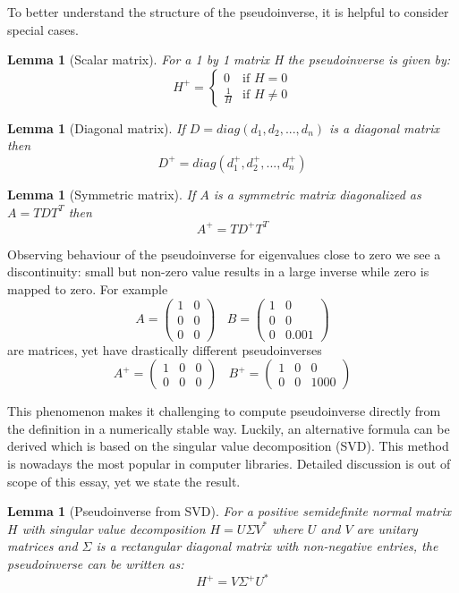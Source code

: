 \documentclass[a4paper,11pt]{article}
\theoremstyle{break}
\newtheorem{lemma}[theorem]{Lemma}
\begin{document}
To better understand the structure of the pseudoinverse, it is helpful to consider special cases.
\begin{lemma}[Scalar matrix]
    For a 1 by 1 matrix H the pseudoinverse is given by:
    $$ H^+ = \begin{cases}
        0~~~           \text{ if } H = 0\\
        \frac{1}{H}~~ \text{ if } H \neq 0
    \end{cases}$$
\end{lemma}
\begin{lemma}[Diagonal matrix]
    If $D = diag(d_1, d_2, ..., d_n)$ is a diagonal matrix then
    $$ D^+ = diag(d_1^+, d_2^+, ..., d_n^+) $$
\end{lemma}
\begin{lemma}[Symmetric matrix]
    If $A$ is a symmetric matrix diagonalized as $A = T D T^T $ then
    $$ A^+ = T D^+ T^T$$
\end{lemma}

Observing behaviour of the pseudoinverse for eigenvalues close to zero we see a discontinuity: small but non-zero value results in a large inverse while zero is mapped to zero. For example
$$ A = \left( \begin{matrix}
1 & 0 \\
0 & 0 \\
0 & 0
\end{matrix} \right) ~~~~
B = \left( \begin{matrix}
1 & 0 \\
0 & 0 \\
0 & 0.001
\end{matrix} \right)$$
are  matrices, yet have drastically different pseudoinverses
$$ A^+ = \left( \begin{matrix}
1 & 0 & 0\\
0 & 0 & 0
\end{matrix} \right) ~~~~
B^+ = \left( \begin{matrix}
1 & 0 & 0\\
0 & 0 & 1000
\end{matrix} \right)$$

This phenomenon makes it challenging to compute pseudoinverse directly from the definition in a numerically stable way. Luckily, an alternative formula can be derived which is based on the singular value decomposition (SVD). This method is nowadays the most popular in computer libraries. Detailed discussion is out of scope of this essay, yet we state the result.
\begin{lemma}[Pseudoinverse from SVD]
    For a positive semidefinite normal matrix $H$ with singular value decomposition $H = U \Sigma V^*$ where $U$ and $V$ are unitary matrices and $\Sigma$ is a rectangular diagonal matrix with non-negative entries, the pseudoinverse can be written as:
    $$ H^+ = V \Sigma^+ U^* $$
\end{lemma}
\end{document}
